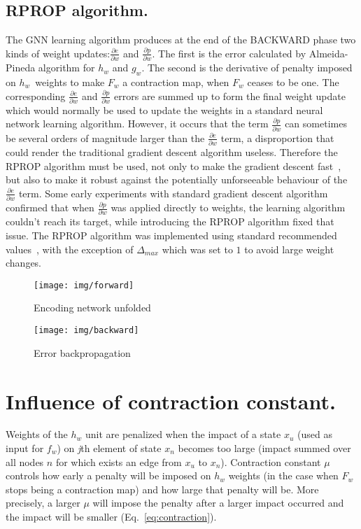 \documentclass[a4paper, 11pt, twocolumn]{spie}  %
\begin{document}
\subsection{RPROP algorithm.}
The GNN learning algorithm produces at the end of the BACKWARD phase two kinds of weight updates:$\frac{\partial e}{\partial w}$ and $\frac{\partial p}{\partial w}$. The first is the error calculated by Almeida-Pineda algorithm for $h_w$ and $g_w$. The second is the derivative of penalty imposed on $h_w$~weights to make $F_w$ a contraction map, when $F_w$ ceases to be one. The corresponding $\frac{\partial e}{\partial w}$ and $\frac{\partial p}{\partial w}$ errors are summed up to form the final weight update which would normally be used to update the weights in a standard neural network learning algorithm. However, it occurs that the term $\frac{\partial p}{\partial w}$ can sometimes be several orders of magnitude larger than the $\frac{\partial e}{\partial w}$ term, a disproportion that could render the traditional gradient descent algorithm useless. Therefore the RPROP algorithm must be used, not only to make the gradient descent fast~, but also to make it robust against the potentially unforseeable behaviour of the  $\frac{\partial e}{\partial w}$ term. Some early experiments with standard gradient descent algorithm confirmed that when $\frac{\partial p}{\partial w}$ was applied directly to weights, the learning algorithm couldn't reach its target, while introducing the RPROP algorithm fixed that issue. The RPROP algorithm was implemented using standard recommended values~, with the exception of $\Delta_{max}$ which was set to $1$ to avoid large weight changes.

\begin{figure}
\begin{center}
	\texttt{[image: img/forward]}
	\caption{Encoding network unfolded}
	\label{fig:forward}
\end{center}
\end{figure}


\begin{figure}
\begin{center}
	\texttt{[image: img/backward]}
	\caption{Error backpropagation}
	\label{fig:backward}
\end{center}
\end{figure}

\newpage
\section{Influence of contraction constant.}
Weights of the $h_w$ unit are penalized when the impact of a state $x_u$ (used as input for $f_w$) on \emph{j}th element of state $x_n$ becomes too large (impact summed over all nodes $n$ for which exists an edge from $x_u$ to $x_n$). Contraction constant $\mu$ controls how early a penalty will be imposed on $h_w$ weights (in the case when $F_w$ stops being a contraction map) and how large that penalty will be. More precisely, a larger $\mu$ will impose the penalty after a larger impact occurred and the impact will be smaller (Eq.~\ref{eq:contraction}).
\end{document}
